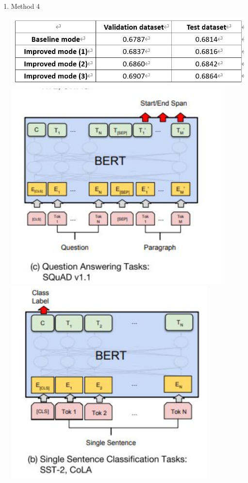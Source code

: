 \documentclass[12pt,twocolumn,letterpaper]{article}
\begin{document}
\begin{enumerate}
\item Method 4

\includegraphics[scale=0.35]{bert3.jpg}\\

\includegraphics[scale=0.8]{bert1.png}\\

\includegraphics[scale=0.8]{bert2.png}\\


\end{enumerate}
\end{document}
